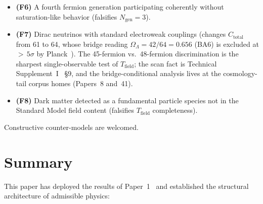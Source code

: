 \documentclass[11pt]{article}
\newenvironment{varlist}{\begin{itemize}[nosep,leftmargin=2em]}{\end{itemize}}
\begin{document}
\begin{varlist}
\item \textbf{(F6)} A fourth fermion generation participating coherently without saturation-like behavior (falsifies $N_{\mathrm{gen}} = 3$).
\item \textbf{(F7)} Dirac neutrinos with standard electroweak couplings (changes $C_{\mathrm{total}}$ from 61 to 64, whose bridge reading $\Omega_\Lambda = 42/64 = 0.656$ (BA6) is excluded at ${>}\,5\sigma$ by Planck~\cite{Planck2020}).  The 45-fermion vs.\ 48-fermion discrimination is the sharpest single-observable test of $T_{\mathrm{field}}$; the scan fact is Technical Supplement~I~\cite{BrookeP2Supplement} \S9, and the bridge-conditional analysis lives at the cosmology-tail corpus homes (Papers~8 and~41).
\item \textbf{(F8)} Dark matter detected as a fundamental particle species not in the Standard Model field content (falsifies $T_{\mathrm{field}}$ completeness).
\end{varlist}

Constructive counter-models are welcomed.


\section{Summary}
\label{sec:summary}

This paper has deployed the results of Paper~1~\cite{BrookePaper1} and established the structural architecture of admissible physics:
\end{document}
